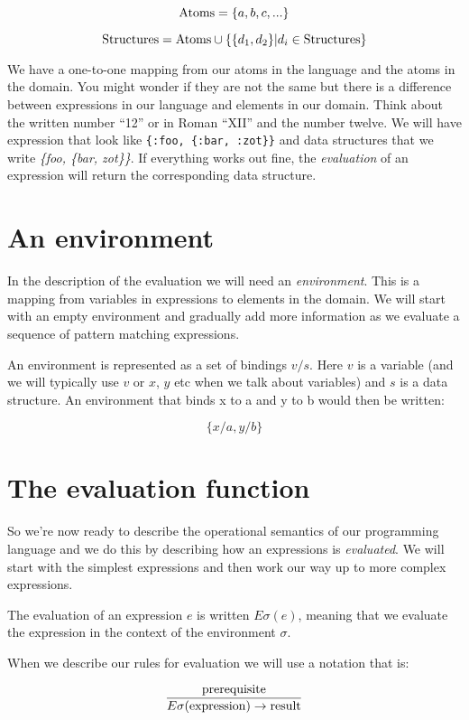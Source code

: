 \documentclass[a4paper,11pt]{article}
\begin{document}
$${\rm Atoms} =  \{a,b,c, ...\}$$

$${\rm Structures} = {\rm Atoms} \cup \{\{d_1, d_2\} | d_i \in {\rm Structures}\}$$

We have a one-to-one mapping from our atoms in the
language and the atoms in the domain. You might wonder if they are not
the same but there is a difference between expressions in our language
and elements in our domain. Think about the written number ``12'' or
in Roman ``XII'' and the number twelve. We will have expression that
look like {\tt \{:foo, \{:bar, :zot\}\}} and data structures that we
write {\em \{foo, \{bar, zot\}\}}. If everything works out fine, the
{\em evaluation} of an expression will return the corresponding data
structure.

\section{An environment}

In the description of the evaluation we will need an {\em
  environment}. This is a mapping from variables in expressions to
elements in the domain. We will start with an empty environment and
gradually add more information as we evaluate a sequence of pattern
matching expressions. 

An environment is represented as a set of bindings $v/s$. Here $v$ is
a variable (and we will typically use $v$ or $x$, $y$ etc when we talk
about variables) and $s$ is a data structure. An environment that
binds x to a and y to b would then be written:

$$\{x/a, y/b\}$$


\section{The evaluation function}

So we're now ready to describe the operational semantics of our
programming language and we do this by describing how an expressions is
{\em evaluated}. We will start with the simplest expressions and then
work our way up to more complex expressions.

The evaluation of an expression $e$ is written $E\sigma(e)$, meaning
that we evaluate the expression in the context of the environment $\sigma$.

When we describe our rules for evaluation we will use
 a notation that is:

$$\frac{{\rm prerequisite}}{E\sigma({\rm expression}) \rightarrow {\rm result}}$$
\end{document}
